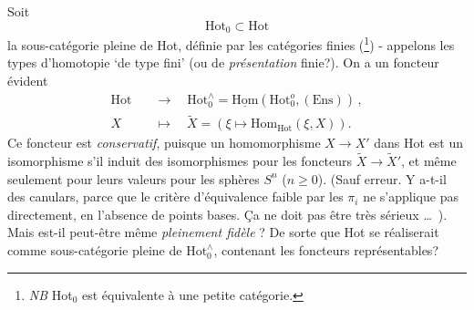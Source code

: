 \documentclass[11pt]{article}
\newcommand{\printedpage}[1]{\marginpar{\footnotesize p.~#1}}
\newcommand{\msp}[1]{\marginpar{\footnotesize [#1]}}
\newcommand{\uHom}{\underline{\mathrm{Hom}}}
\newcommand{\Hom}{\mathrm{Hom}}
\newcommand{\Hot}{\mathrm{Hot}}
\newcommand{\Ens}{\mathrm{Ens}}
\begin{document}
Soit
\[
\Hot_0 \subset \Hot
\]
\printedpage{32}
la sous-catégorie pleine de Hot, définie par les catégories finies (\footnote[9]{\textit{NB} Hot$_0$ est équivalente à une petite catégorie.}) - appelons les types d'homotopie `de type fini' (ou de \textit{présentation} finie?). On a un foncteur évident
\msp{page 52}
\[
\begin{aligned}
\Hot \quad &\longrightarrow \quad \Hot_0^{\wedge} = \uHom(\Hot_0^{o}, (\Ens)) \, ,\\
X \quad &\longmapsto \quad \tilde{X} = (\xi \longmapsto \Hom_{\Hot}(\xi, X)).
\end{aligned}
\]
Ce foncteur est \textit{conservatif}, puisque un homomorphisme $X \longrightarrow X'$ dans Hot est un isomorphisme s'il induit des isomorphismes pour les foncteurs $\tilde{X} \longrightarrow \tilde{X}'$, et même seulement pour leurs valeurs pour les sphères $S^n$ ($n \geq 0$). (Sauf erreur. Y a-t-il des canulars, parce que le critère d'équivalence faible par les $\pi_i$ ne s'applique pas directement, en l'absence de points bases. Ça ne doit pas être très sérieux \ldots\ ). Mais est-il peut-être même \textit{pleinement fidèle} ? De sorte que Hot se réaliserait comme sous-catégorie pleine de $\Hot_0^{\wedge}$, contenant les foncteurs représentables?
\end{document}
